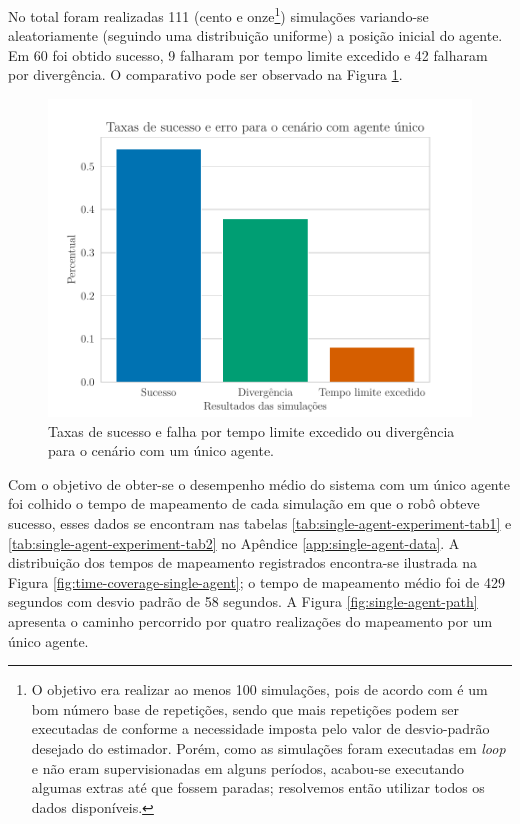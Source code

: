 No total foram realizadas 111 (cento e onze\footnote{O objetivo era realizar ao menos 100 simulações, pois de acordo com  é um bom número base de repetições, sendo que mais repetições podem ser executadas de conforme a necessidade imposta pelo valor de desvio-padrão desejado do estimador. Porém, como as simulações foram executadas em \textit{loop} e não eram supervisionadas em alguns períodos, acabou-se executando algumas extras até que fossem paradas; resolvemos então utilizar todos os dados disponíveis.}) simulações variando-se aleatoriamente (seguindo uma distribuição uniforme) a posição inicial do agente. Em 60 foi obtido 
sucesso, 9 falharam por tempo limite excedido e 42 falharam por 
divergência. O comparativo pode ser observado na Figura \ref{fig:exp-single-robot-sucess-rate}.
\begin{figure}
  \centering
  \includegraphics[width=.7\textwidth]{figs/success_rate_bar_single_robot.pdf}
  \caption[Taxas de sucesso e falha para simulações com um único agente]{Taxas de sucesso e falha por tempo limite excedido ou divergência para o cenário com um único agente.}
  \label{fig:exp-single-robot-sucess-rate}
\end{figure}

Com o objetivo de obter-se o desempenho médio do sistema com um único 
agente foi colhido o tempo de mapeamento de cada simulação em que o
robô obteve sucesso, esses dados se encontram nas tabelas \ref{tab:single-agent-experiment-tab1} e \ref{tab:single-agent-experiment-tab2} no Apêndice 
\ref{app:single-agent-data}. A distribuição dos tempos de mapeamento 
registrados encontra-se ilustrada na Figura \ref{fig:time-coverage-single-agent}; o tempo de mapeamento médio foi de 
429 segundos com desvio padrão de 58 segundos. A Figura \ref{fig:single-agent-path} apresenta o caminho percorrido por quatro 
realizações do mapeamento por um único agente.

